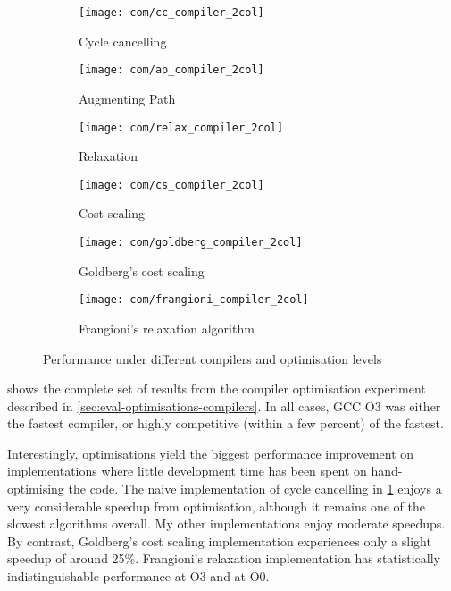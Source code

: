 \begin{figure}
    \begin{widepage}
    \begin{subfigure}[c]{0.5\textwidth}
        \texttt{[image: com/cc\_compiler\_2col]}
        \caption{Cycle cancelling}
        \label{fig:compilers:cc}
    \end{subfigure}
    \begin{subfigure}[c]{0.5\textwidth}
        \texttt{[image: com/ap\_compiler\_2col]}
        \caption{Augmenting Path}
        \label{fig:compilers:ap}
    \end{subfigure}
    \begin{subfigure}[c]{0.5\textwidth}
        \texttt{[image: com/relax\_compiler\_2col]}
        \caption{Relaxation}
        \label{fig:compilers:relax}
    \end{subfigure}
    \begin{subfigure}[c]{0.5\textwidth}
        \texttt{[image: com/cs\_compiler\_2col]}
        \caption{Cost scaling}
        \label{fig:compilers:cs}
    \end{subfigure}
    \begin{subfigure}[c]{0.5\textwidth}
        \texttt{[image: com/goldberg\_compiler\_2col]}
        \caption{Goldberg's cost scaling}
        \label{fig:compilers:goldberg}
    \end{subfigure}
    \begin{subfigure}[c]{0.5\textwidth}
        \texttt{[image: com/frangioni\_compiler\_2col]}
        \caption{Frangioni's relaxation algorithm}
        \label{fig:compilers:frangioni}
    \end{subfigure}
    \end{widepage}
    \caption{Performance under different compilers and optimisation levels}
    \label{fig:compilers}
\end{figure}

 shows the complete set of results from the compiler optimisation experiment described in \cref{sec:eval-optimisations-compilers}. In all cases, GCC O3 was either the fastest compiler, or highly competitive (within a few percent) of the fastest. 

Interestingly, optimisations yield the biggest performance improvement on implementations where little development time has been spent on hand-optimising the code. The naive implementation of cycle cancelling in \cref{fig:compilers:cc} enjoys a very considerable speedup from optimisation, although it remains one of the slowest algorithms overall\footnotemark. My other implementations enjoy moderate speedups. By contrast, Goldberg's cost scaling implementation experiences only a slight speedup of around 25\%. Frangioni's relaxation implementation has statistically indistinguishable performance at O3 and at O0.

